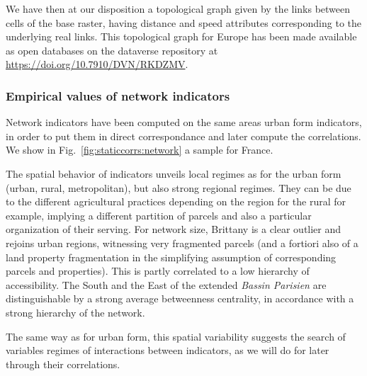 
We have then at our disposition a topological graph given by the links between cells of the base raster, having distance and speed attributes corresponding to the underlying real links. This topological graph for Europe has been made available as open databases on the dataverse repository at \url{https://doi.org/10.7910/DVN/RKDZMV}.





\subsubsection{Empirical values of network indicators}


Network indicators have been computed on the same areas  urban form indicators, in order to put them in direct correspondance and later compute the correlations. We show in Fig.~\ref{fig:staticcorrs:network} a sample for France.

The spatial behavior of indicators unveils local regimes as for the urban form (urban, rural, metropolitan), but also strong regional regimes. They can be due to the different agricultural practices depending on the region for the rural for example, implying a different partition of parcels and also a particular organization of their serving. For network size, Brittany is a clear outlier and rejoins urban regions, witnessing very fragmented parcels (and a fortiori also of a land property fragmentation in the simplifying assumption of corresponding parcels and properties). This is partly correlated to a low hierarchy of accessibility. The South and the East of the extended \emph{Bassin Parisien} are distinguishable by a strong average betweenness centrality, in accordance with a strong hierarchy of the network.

The same way as for urban form, this spatial variability suggests the search of variables regimes of interactions between indicators, as we will do for later through their correlations.


